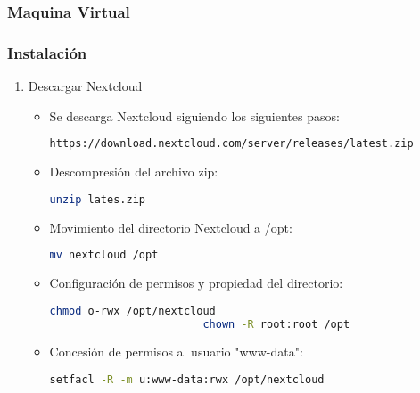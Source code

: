 			\subsubsection{Maquina Virtual}
	
			\subsubsection{Instalación}
			
			\begin{enumerate}
				
				\item Descargar Nextcloud
				
				\begin{itemize}
					
					\item Se descarga Nextcloud siguiendo los siguientes pasos:
		
						\begin{lstlisting}[language=Bash,caption=Directorio de trabajo NextCloud]
						https://download.nextcloud.com/server/releases/latest.zip
						\end{lstlisting}
					\item Descompresión del archivo zip:	
						\begin{lstlisting}[language=Bash,caption=Directorio de trabajo NextCloud]
						unzip lates.zip
						\end{lstlisting}
					\item Movimiento del directorio Nextcloud a /opt:	
						\begin{lstlisting}[language=Bash,caption=Directorio de trabajo NextCloud]
						mv nextcloud /opt
						\end{lstlisting}
					\item Configuración de permisos y propiedad del directorio:
						\begin{lstlisting}[language=Bash,caption=Directorio de trabajo NextCloud]
						chmod o-rwx /opt/nextcloud
						chown -R root:root /opt
						\end{lstlisting}
					\item Concesión de permisos al usuario "www-data":					
						\begin{lstlisting}[language=Bash,caption=Directorio de trabajo NextCloud]
						setfacl -R -m u:www-data:rwx /opt/nextcloud
						\end{lstlisting}
							
				\end{itemize}
				

\end{enumerate}
